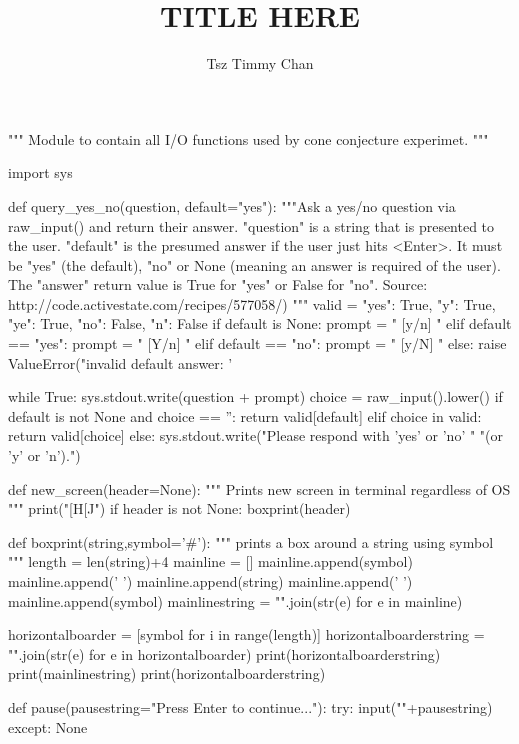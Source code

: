 \documentclass{TC}
\title{TITLE HERE}	%
\author{Tsz Timmy Chan}	%
\begin{document}
\begin{SAGE}
""" Module to contain all I/O functions used by 
cone conjecture experimet.
"""



import sys

def query_yes_no(question, default="yes"):
	"""Ask a yes/no question via raw_input() and return their answer.
	"question" is a string that is presented to the user.
	"default" is the presumed answer if the user just hits <Enter>.
		It must be "yes" (the default), "no" or None (meaning
		an answer is required of the user).
	The "answer" return value is True for "yes" or False for "no".
	Source: http://code.activestate.com/recipes/577058/)
	"""
	valid = {"yes": True, "y": True, "ye": True,
			 "no": False, "n": False}
	if default is None:
		prompt = " [y/n] "
	elif default == "yes":
		prompt = " [Y/n] "
	elif default == "no":
		prompt = " [y/N] "
	else:
		raise ValueError("invalid default answer: '%

	while True:
		sys.stdout.write(question + prompt)
		choice = raw_input().lower()
		if default is not None and choice == '':
			return valid[default]
		elif choice in valid:
			return valid[choice]
		else:
			sys.stdout.write("Please respond with 'yes' or 'no' "
							 "(or 'y' or 'n').\n")


def new_screen(header=None):
	""" Prints new screen in terminal regardless of OS """
	print("[H[J")
	if header is not None:
		boxprint(header)

def boxprint(string,symbol='#'):
	""" prints a box around a string using symbol """
	length = len(string)+4
	mainline = []
	mainline.append(symbol)
	mainline.append(' ')
	mainline.append(string)
	mainline.append(' ')
	mainline.append(symbol)
	mainlinestring = "".join(str(e) for e in mainline)

	horizontalboarder = [symbol for i in range(length)]
	horizontalboarderstring = "".join(str(e) for e in horizontalboarder)
	print(horizontalboarderstring)
	print(mainlinestring)
	print(horizontalboarderstring)

def pause(pausestring="Press Enter to continue..."):
	try:
		input("\n"+pausestring)
	except:
		None


\end{SAGE}
\end{document}
